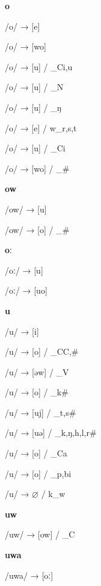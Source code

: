 \begin{center}\textbf{o}\end{center}
\begin{multicols}{4}
\noindent /o/ → [e]

\noindent /o/ → [wo]

\noindent /o/ → [u] / \_C{i,u}

\noindent /o/ → [u] / \_N

\noindent /o/ → [u] / \_ŋ

\noindent /o/ → [e] / w\_{r,s,t}

\noindent /o/ → [u] / \_Ci

\noindent /o/ → [wo] / \_\#

\end{multicols}

\begin{center}\textbf{ow}\end{center}
\begin{multicols}{4}
\noindent /ow/ → [u]

\noindent /ow/ → [o] / \_\#

\end{multicols}

\begin{center}\textbf{oː}\end{center}
\begin{multicols}{4}
\noindent /oː/ → [u]

\noindent /oː/ → [uo]

\end{multicols}

\begin{center}\textbf{u}\end{center}
\begin{multicols}{4}
\noindent /u/ → [i]

\noindent /u/ → [o] / \_C{C,\#}

\noindent /u/ → [əw] / \_V

\noindent /u/ → [o] / \_k\#

\noindent /u/ → [uj] / \_{t,s}\#

\noindent /u/ → [uə] / \_{k,ŋ,h,l,r}\#

\noindent /u/ → [o] / \_Ca

\noindent /u/ → [o] / \_{p,b}i

\noindent /u/ → $\varnothing$ / k\_w

\end{multicols}

\begin{center}\textbf{uw}\end{center}
\begin{multicols}{4}
\noindent /uw/ → [ow] / \_C

\end{multicols}

\begin{center}\textbf{uwa}\end{center}
\begin{multicols}{4}
\noindent /uwa/ → [oː]

\end{multicols}

